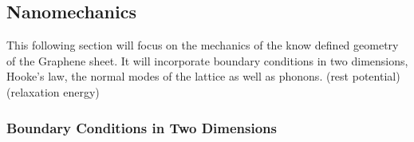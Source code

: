 \subsection{Nanomechanics}
This following section will focus on the mechanics of the know defined geometry of the Graphene sheet. It will incorporate boundary conditions in two dimensions, Hooke's law, the normal modes of the lattice as well as phonons. (rest potential) (relaxation energy)

\subsubsection{Boundary Conditions in Two Dimensions}



